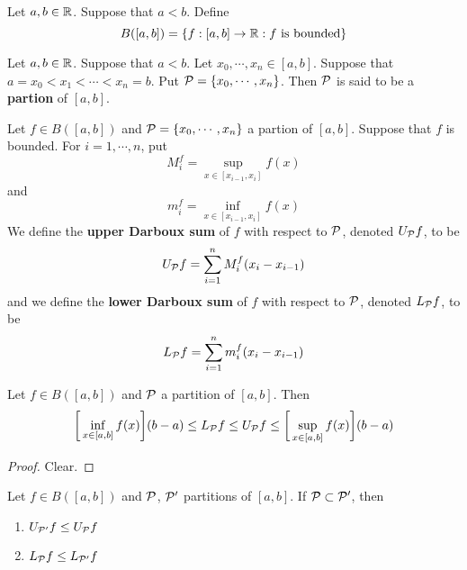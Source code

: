 \documentclass{book}
\begin{document}
	\begin{defn}  
		Let $a,b \in \mathbb{R}$. Suppose that $a<b$. Define $$B([a,b]) = \{f:[a,b] \rightarrow \mathbb{R}: f\text{ is bounded}\}$$
	\end{defn}
	
	\begin{defn}  
		Let $a,b \in \mathbb{R}$. Suppose that $a<b$. Let $x_0, \cdots, x_n \in [a,b]$. Suppose that $a= x_0 < x_1 < \cdots < x_n = b$. Put $\mathcal{P} = \{x_0, \cdots, x_n\}$. Then $\mathcal{P}$ is said to be a \textbf{partion} of $[a,b]$. 
	\end{defn}
	
	\begin{defn}  
		Let $f \in B([a,b])$ and $\mathcal{P} = \{x_0, \cdots, x_n\}$ a partion of $[a,b]$. Suppose that $f$ is bounded. For $i = 1, \cdots, n$, put 
		$$M^f_i = \sup_{x \in [x_{i-1}, x_i]} f(x)$$ and 
		$$m^f_i = \inf_{x \in [x_{i-1}, x_i]} f(x)$$ 
		We define the \textbf{upper Darboux sum} of $f$ with respect to $\mathcal{P}$, denoted $U_{\mathcal{P}} f$, to be $$U_{\mathcal{P}} f = \sum_{i=1}^n M^f_i (x_i - x_{i-1})$$ 
		and we define the \textbf{lower Darboux sum} of $f$ with respect to $\mathcal{P}$, denoted $L_{\mathcal{P}} f$, to be
		$$L_{\mathcal{P}} f = \sum_{i=1}^n m^f_i (x_i - x_{i-1})$$ 
	\end{defn}

	\begin{ex}  
		Let $f \in B([a,b])$ and $\mathcal{P}$ a partition of $[a,b]$. Then $$\bigg[\inf_{x \in [a,b]} f(x) \bigg] (b-a) \leq L_{\mathcal{P}} f \leq U_{\mathcal{P}} f \leq \bigg[ \sup_{x \in [a,b]} f(x)  \bigg] (b-a)$$
	\end{ex}

	\begin{proof}
		Clear.
	\end{proof}

	\begin{ex}  
			Let $f \in B([a,b])$ and $\mathcal{P}$, $\mathcal{P}'$ partitions of $[a,b]$. If $\mathcal{P} \subset \mathcal{P}'$, then 
			\begin{enumerate}
				\item $U_{\mathcal{P}'} f \leq U_{\mathcal{P}} f$
				\item $L_{\mathcal{P}} f \leq L_{\mathcal{P}'} f$
			\end{enumerate}
	\end{ex}
\end{document}
